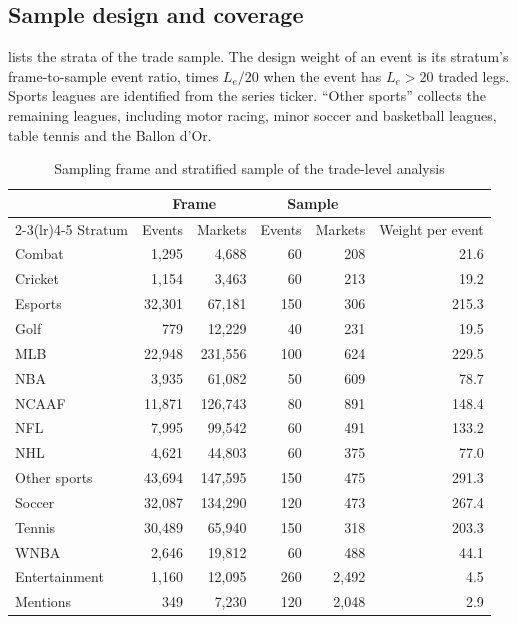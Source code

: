 \subsection{Sample design and coverage}\label{app:flow-design}

 lists the strata of the trade sample. The design weight of an event is
its stratum's frame-to-sample event ratio, times $L_e/20$ when the event has $L_e>20$ traded
legs. Sports leagues are identified from the series ticker. ``Other sports'' collects the
remaining leagues, including motor racing, minor soccer and basketball leagues, table tennis
and the Ballon d'Or.

\begin{table}[htbp]
\centering
\begin{threeparttable}
\caption{Sampling frame and stratified sample of the trade-level analysis}\label{tab:flow-design}
\small
\begin{tabular}{lrrrrr}
\toprule
 & \multicolumn{2}{c}{Frame} & \multicolumn{2}{c}{Sample} & \\
\cmidrule(lr){2-3}\cmidrule(lr){4-5}
Stratum & Events & Markets & Events & Markets & Weight per event \\
\midrule
Combat & 1,295 & 4,688 & 60 & 208 & 21.6 \\
Cricket & 1,154 & 3,463 & 60 & 213 & 19.2 \\
Esports & 32,301 & 67,181 & 150 & 306 & 215.3 \\
Golf & 779 & 12,229 & 40 & 231 & 19.5 \\
MLB & 22,948 & 231,556 & 100 & 624 & 229.5 \\
NBA & 3,935 & 61,082 & 50 & 609 & 78.7 \\
NCAAF & 11,871 & 126,743 & 80 & 891 & 148.4 \\
NFL & 7,995 & 99,542 & 60 & 491 & 133.2 \\
NHL & 4,621 & 44,803 & 60 & 375 & 77.0 \\
Other sports & 43,694 & 147,595 & 150 & 475 & 291.3 \\
Soccer & 32,087 & 134,290 & 120 & 473 & 267.4 \\
Tennis & 30,489 & 65,940 & 150 & 318 & 203.3 \\
WNBA & 2,646 & 19,812 & 60 & 488 & 44.1 \\
Entertainment & 1,160 & 12,095 & 260 & 2,492 & 4.5 \\
Mentions & 349 & 7,230 & 120 & 2,048 & 2.9 \\

\end{tabular}
\end{threeparttable}
\end{table}
